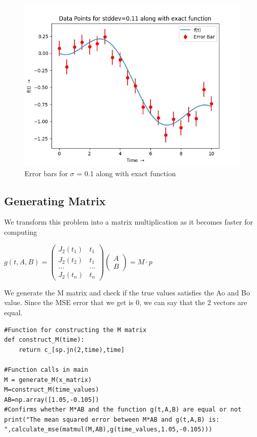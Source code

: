 \documentclass[11pt, a4paper]{article}
\begin{document}
\begin{figure}[!tbh]
   	\centering
   	\includegraphics[scale=0.6]{plots/Ques5.jpg}  %
   	\caption{Error bars for $\sigma$ = 0.1 along with exact function}
   	\label{fig:Error bar}
   \end{figure}
   

\subsection{Generating Matrix}
\par We transform this problem into a matrix multiplication as it becomes faster for computing 

\begin{center}
     $   g(t,A,B) = 
    \begin{pmatrix}
    J_{2}(t_{1})& t_{1}\\
    J_{2}(t_{2}) & t_{1}\\
    ... & ...\\
    J_{2}(t_{n})& t_{n}
    \end{pmatrix}
     \begin{pmatrix}
        A \\
        B
    \end{pmatrix} = M\cdot p$
    
\end{center}
\par We generate the  M matrix and check if the true values satisfies the Ao and Bo value. Since the MSE error that we get is 0, we can say that the 2 vectors are equal.
\begin{lstlisting}
#Function for constructing the M matrix
def construct_M(time):
    return c_[sp.jn(2,time),time]

#Function calls in main
M = generate_M(x_matrix)
M=construct_M(time_values)
AB=np.array([1.05,-0.105])
#Confirms whether M*AB and the function g(t,A,B) are equal or not
print("The mean squared error between M*AB and g(t,A,B) is: ",calculate_mse(matmul(M,AB),g(time_values,1.05,-0.105)))

\end{lstlisting}
    
\end{document}
